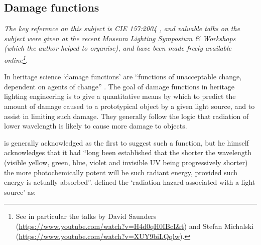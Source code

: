 
\subsection{Damage functions} \label{sec:DamageIndex}


\textit{The key reference on this subject is \gls{CIE} 157:2004 \citep{cie_cie_2004}, and valuable talks on the subject were given at the recent Museum Lighting Symposium \& Workshops \citep{pokorska_book_2017} (which the author helped to organise), and have been made freely available online\footnote{See in particular the talks by David Saunders (\url{https://www.youtube.com/watch?v=H4d0qH0IBcI&t}) and Stefan Michalski (\url{https://www.youtube.com/watch?v=XUY9biLQqlw}).}}.

\bigskip

In heritage science `damage functions' are ``functions of unacceptable change, dependent on agents of change'' \citep{strlic_damage_2013}. The goal of damage functions in heritage lighting engineering is to give a quantitative means by which to predict the amount of damage caused to a prototypical object by a given light source, and to assist in limiting such damage. They generally follow the logic that radiation of lower wavelength is likely to cause more damage to objects.

\citet{harrison_report_1953} is generally acknowledged as the first to suggest such a function, but he himself acknowledges that it had ``long been established that the shorter the wavelength (visible yellow, green, blue, violet and invisible UV being progressively shorter) the more photochemically potent will be such radiant energy, provided such energy is actually absorbed''. \citet[p.9]{harrison_report_1953} defined the `radiation hazard associated with a light source' as:

